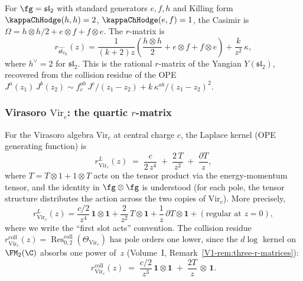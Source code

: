 \begin{remark}
For $\fg = \mathfrak{sl}_2$ with standard generators $e, f, h$
and Killing form $\kappaChHodge(h,h) = 2$, $\kappaChHodge(e,f) = 1$, the Casimir
is $\Omega = h \otimes h/2 + e \otimes f + f \otimes e$. The
$r$-matrix is
\[
r_{\widehat{\mathfrak{sl}_2}_k}(z)
= \frac{1}{(k+2)z}
\left(\frac{h \otimes h}{2} + e \otimes f + f \otimes e\right)
+ \frac{k}{z^2}\,\kappa,
\]
where $h^\vee = 2$ for $\mathfrak{sl}_2$. This is the rational
$r$-matrix of the Yangian $Y(\mathfrak{sl}_2)$, recovered from the
collision residue of the OPE
$J^a(z_1)\, J^b(z_2) \sim f^{ab}_c\, J^c/(z_1 - z_2) +
k\,\kappa^{ab}/(z_1 - z_2)^2$.
\end{remark}

\subsubsection{Virasoro $\mathrm{Vir}_c$: the quartic $r$-matrix}

\begin{theorem}
For the Virasoro algebra $\mathrm{Vir}_c$ at central charge $c$,
the Laplace kernel (OPE generating function) is
\begin{equation}
\boxed{
r^L_{\mathrm{Vir}_c}(z)
\;=\;
\frac{c}{2\,z^4}
\;+\;
\frac{2\,T}{z^2}
\;+\;
\frac{\partial T}{z},
}
\end{equation}
where $T = T \otimes 1 + 1 \otimes T$ acts on the tensor product
via the energy-momentum tensor, and the identity in $\fg \otimes \fg$
is understood (for each pole, the tensor structure distributes the
action across the two copies of $\mathrm{Vir}_c$). More precisely,
\begin{equation}
r^L_{\mathrm{Vir}_c}(z)
= \frac{c/2}{z^4}\, \mathbf{1} \otimes \mathbf{1}
+ \frac{2}{z^2}\, T \otimes \mathbf{1}
+ \frac{1}{z}\, \partial T \otimes \mathbf{1}
+ (\text{regular at } z = 0),
\end{equation}
where we write the ``first slot acts'' convention.
The collision residue
$r^{\mathrm{coll}}_{\mathrm{Vir}_c}(z)
= \operatorname{Res}^{\mathrm{coll}}_{0,2}(\Theta_{\mathrm{Vir}_c})$
has pole orders one lower, since the $d\log$ kernel on
$\FM_2(\C)$ absorbs one power of~$z$
\textup{(}Volume~I, Remark~\textup{\ref{V1-rem:three-r-matrices}}\textup{)}:
\begin{equation}
r^{\mathrm{coll}}_{\mathrm{Vir}_c}(z)
\;=\;
\frac{c/2}{z^3}\,\mathbf{1}\otimes\mathbf{1}
\;+\;
\frac{2T}{z}\,\otimes\,\mathbf{1}.
\end{equation}
\end{theorem}

